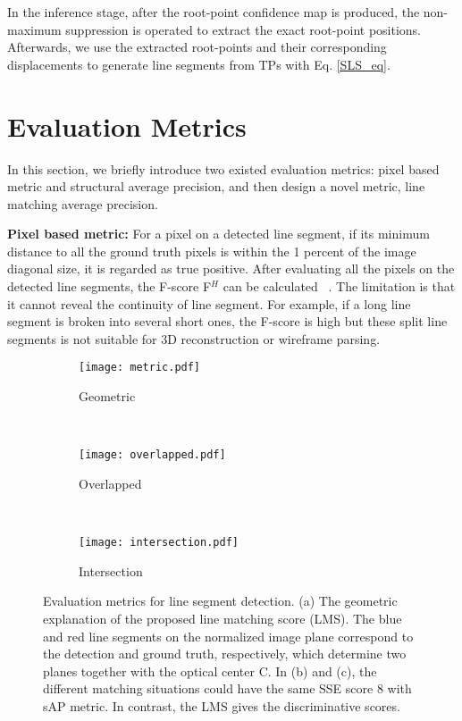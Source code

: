 \documentclass[runningheads]{llncs}
\begin{document}
In the inference stage, after the root-point confidence map is produced, the non-maximum suppression is operated to extract the exact root-point positions.  Afterwards, we use the extracted root-points and their corresponding displacements to generate line segments from TPs with Eq. \eqref{SLS_eq}.



\section{Evaluation Metrics} \label{eva_matric}
In this section, we briefly introduce two existed evaluation metrics: pixel based metric and structural average precision, and then design a novel metric, line matching average precision.

\textbf{Pixel based metric:}
For a pixel on a detected line segment, if its minimum distance to all the ground truth pixels is within the 1 percent of the image diagonal size, it is regarded as true positive. After evaluating all the pixels on the detected line segments, the F-score F$^H$ can be calculated ~\cite{Wireframe, AFM, LCNN}. The limitation is that it cannot reveal the continuity of line segment. For example, if a long line segment is broken into several short ones, the F-score is high but these split line segments is not suitable for 3D reconstruction or wireframe parsing.

\begin{figure}[t]
    \centering
    \begin{subfigure}[b]{0.3\textwidth}
         \centering
         \texttt{[image: metric.pdf]}
         \caption{\centering Geometric}
         \label{sub_fig:metric}
     \end{subfigure}
     ~~
     \begin{subfigure}[b]{0.3\textwidth}
         \centering
         \texttt{[image: overlapped.pdf]}
         \caption{\centering Overlapped}
         \label{sub_fig:overlapped}
     \end{subfigure}
    ~~
    \begin{subfigure}[b]{0.3\textwidth}
         \centering
         \texttt{[image: intersection.pdf]}
         \caption{\centering Intersection}
         \label{sub_fig:intersection}
    \end{subfigure}

    \caption{Evaluation metrics for line segment detection. (a) The geometric explanation of the proposed line matching score (LMS). The blue and red line segments on the normalized image plane correspond to the detection and ground truth, respectively, which determine two planes together with the optical center C. In (b) and (c), the different matching situations could have the same SSE score 8 with sAP metric. In contrast, the LMS gives the discriminative scores.}
    \label{sap}
\end{figure}
\end{document}
